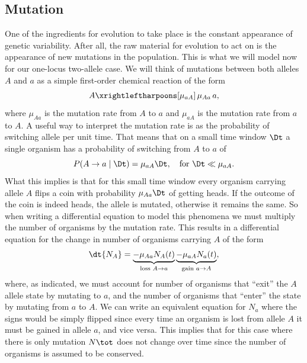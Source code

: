 \subsection{Mutation}

One of the ingredients for evolution to take place is the constant appearance
of genetic variability. After all, the raw material for evolution to act on is
the appearance of new mutations in the population. This is what we will model
now for our one-locus two-allele case. We will think of mutations between both
alleles $A$ and $a$ as a simple first-order chemical reaction of the form
\begin{equation}
  A \xrightleftharpoons[\mu_{a A}]
  {\,\mu_{A a}\,} a,
\end{equation}
where $\mu_{A a}$ is the mutation rate from $A$ to $a$ and 
$\mu_{a A}$ is the mutation rate from $a$ to $A$. A useful way to
interpret the mutation rate is as the probability of switching allele per unit
time. That means that on a small time window $\Dt$ a single organism has a
probability of switching from $A$ to $a$ of
\begin{equation}
  P(A \rightarrow a \mid \Dt) = \mu_{a A} \Dt, \quad 
  \text{for } \Dt \ll \mu_{aA}.
\end{equation}
What this implies is that for this small time window every organism carrying
allele $A$ flips a coin with probability $\mu_{A a} \Dt$ of getting
heads. If the outcome of the coin is indeed heads, the allele is mutated,
otherwise it remains the same. So when writing a differential equation to model
this phenomena we must multiply the number of organisms by the mutation rate.
This results in a differential equation for the change in number of organisms
carrying $A$ of the form
\begin{equation}
  \dt{N_A} = 
  \underbrace{- \mu_{A a} N_A(t)}_{\text{loss } A \rightarrow a}
  \underbrace{- \mu_{a A} N_a(t)}_{\text{gain } a \rightarrow A},
\end{equation}
where, as indicated, we must account for number of organisms that ``exit'' the
$A$ allele state by mutating to $a$, and the number of organisms that ``enter''
the state by mutating from $a$ to $A$. We can write an equivalent equation for
$N_a$ where the signs would be simply flipped since every time an organism is
lost from allele $A$ it must be gained in allele $a$, and vice versa. This
implies that for this case where there is only mutation $N\tot$ does not change
over time since the number of organisms is assumed to be conserved.

